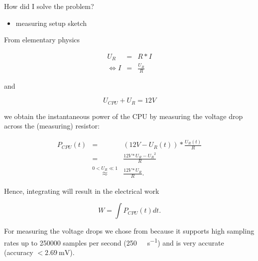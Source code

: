 
How did I solve the problem?

\begin{itemize}

\item measuring setup sketch

\end{itemize}

\label{sec:calc-work}

From elementary physics

\begin{eqnarray}
     U_R & = & R * I \\
  \iff I & = & \frac{U_R}{R}
\end{eqnarray}

and

\begin{equation}
  U_{CPU} + U_{R} = 12 V
\end{equation}

we obtain the instantaneous power of the CPU by measuring the voltage drop
across the (measuring) resistor:

\begin{eqnarray}
P_{CPU}(t) & = & (12V - U_R(t)) * \frac{U_R(t)}{R} \\
           & = & \frac{12V * U_R - {U_R}^2}{R} \\
           & \stackrel{0 < U_R \ll 1}{\approx} & \frac{12V * U_R}{R}.
\end{eqnarray}

Hence, integrating will result in the electrical work

\begin{equation}
  W = \int P_{CPU}(t)dt.
\end{equation}


\label{sec:measuring-setup}


For measuring the voltage drops we chose
from  because it supports
high sampling rates up to 250000 samples per second
(\SI{250}{\kilo\samples\per\second}) and is very
accurate (accuracy $< \SI{2.69}{\milli\volt}$)\cite{NISpec2009}.



